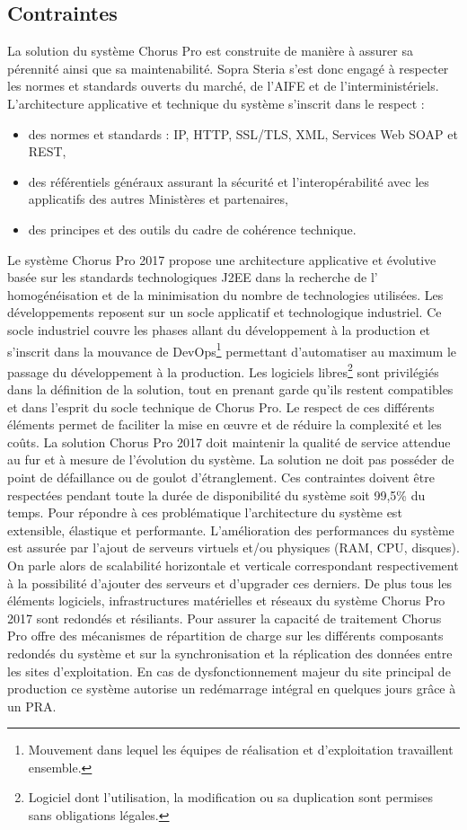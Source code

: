 \documentclass[12pt,a4paper]{article}
\begin{document}
\subsection{Contraintes}
La solution du système Chorus Pro est construite de manière à assurer sa pérennité ainsi que sa maintenabilité. Sopra Steria s'est donc engagé à respecter les normes et standards ouverts du marché, de l'AIFE et de l'interministériels. L’architecture applicative et technique du système s’inscrit dans le respect :
\smallbreak
\begin{itemize}
\item	des normes et standards : IP, HTTP, SSL/TLS, XML, Services Web \gls{SOAP} et \gls{REST},
\item	des référentiels généraux assurant la sécurité et l’interopérabilité avec les applicatifs des autres Ministères et partenaires,
\item	des principes et des outils du cadre de cohérence technique.
\end{itemize}
\medbreak
Le système Chorus Pro 2017 propose une architecture applicative et évolutive basée sur les standards technologiques \gls{J2EE} dans la recherche de l’ homogénéisation et de la minimisation du nombre de technologies utilisées. Les développements reposent sur un socle applicatif et technologique industriel. Ce socle industriel couvre les phases allant du développement à la production et s’inscrit dans la mouvance de DevOps\footnote{Mouvement dans lequel les équipes de réalisation et d'exploitation travaillent ensemble.} permettant d’automatiser au maximum le passage du développement à la production. Les logiciels libres\footnote{Logiciel dont l'utilisation, la modification ou sa duplication sont permises sans obligations légales.} sont privilégiés dans la définition de la solution, tout en prenant garde qu’ils restent compatibles et dans l’esprit du socle technique de Chorus Pro. Le respect de ces différents éléments permet de faciliter la mise en œuvre et de réduire la complexité et les coûts.
\smallbreak
La solution Chorus Pro 2017 doit maintenir la qualité de service attendue au fur et à mesure de l’évolution du système. La solution ne doit pas posséder de point de défaillance ou de goulot d'étranglement. Ces contraintes doivent être respectées pendant toute la durée de disponibilité du système soit 99,5\% du temps.
\smallbreak
Pour répondre à ces problématique l'architecture du système est extensible, élastique et performante. L'amélioration des performances du système est assurée par l'ajout de serveurs virtuels et/ou physiques (\gls{RAM}, \gls{CPU}, disques). On parle alors de scalabilité horizontale et verticale correspondant respectivement à la possibilité d'ajouter des serveurs et d'upgrader ces derniers.
\smallbreak
De plus tous les éléments logiciels, infrastructures matérielles et réseaux du système Chorus Pro 2017 sont redondés et résiliants. Pour assurer la capacité de traitement Chorus Pro offre des mécanismes de répartition de charge sur les différents composants redondés du système et sur la synchronisation et la réplication des données entre les sites d’exploitation. En cas de dysfonctionnement majeur du site principal de production ce système autorise un redémarrage intégral en quelques jours grâce à un \gls{PRA}.  
\end{document}
